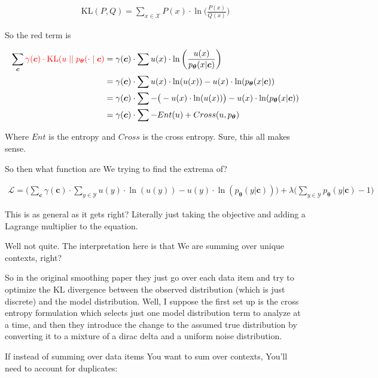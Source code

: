 \documentclass{article}
\newcommand{\KL}{\mathrm{KL}}
\newcommand{\uniform}{u}
\newcommand{\vtheta}{\boldsymbol{\theta}}
\newcommand{\model}{p_{\vtheta}}
\newcommand{\context}{\boldsymbol{c}}
\begin{document}
			\begin{align}
				\KL(P, Q) = \sum_{x\in\mathcal{X}} P(x)\cdot \ln\bigg(\frac{P(x)}{Q(x)}\bigg)
			\end{align}
		
			So the red term is
			
			\begin{align}
				\sum_{\context} {\color{red}\gamma(\context) \cdot 						\KL(\uniform \mid\mid \model(\cdot \mid \context)} &= \gamma(\context)\cdot\sum u(x)\cdot \ln\bigg(\frac{u(x)}{\model(x|\context)}\bigg)\\
			&= \gamma(\context)\cdot\sum u(x)\cdot\ln(u(x)) - u(x)\cdot\ln(\model(x|\context))\\
				&= \gamma(\context)\cdot\sum -\big(-u(x)\cdot\ln(u(x))\big) - u(x)\cdot\ln(\model(x|\context))\\
				&= \gamma(\context)\cdot\sum -Ent(u) + Cross(u, \model)
			\end{align}
			
			Where $Ent$ is the entropy and $Cross$ is the cross entropy. Sure, this all makes sense. 
			
			So then what function are We trying to find the extrema of? 
			
			\begin{align}
				\mathcal{L} = \bigg(\sum_{\context} \gamma(\context)\cdot\sum_{y\in\mathcal{Y}} u(y)\cdot\ln(u(y)) - u(y)\cdot\ln(\model(y|\context))\bigg) + \lambda\bigg(\sum_{y\in\mathcal{Y}} \model(y|\context) -1 \bigg)
			\end{align}
			
			This is as general as it gets right? Literally just taking the objective and adding a Lagrange multiplier to the equation. 

			Well not quite. The interpretation here is that We are summing over unique contexts, right?
			
			So in the original smoothing paper they just go over each data item and try to optimize the KL divergence between the observed distribution (which is just discrete) and the model distribution. Well, I suppose the first set up is the cross entropy formulation which selects just one model distribution term to analyze at a time, and then they introduce the change to the assumed true distribution by converting it to a mixture of a dirac delta and a uniform noise distribution.
		
			If instead of summing over data items You want to sum over contexts, You'll need to account for duplicates:
			
\end{document}
